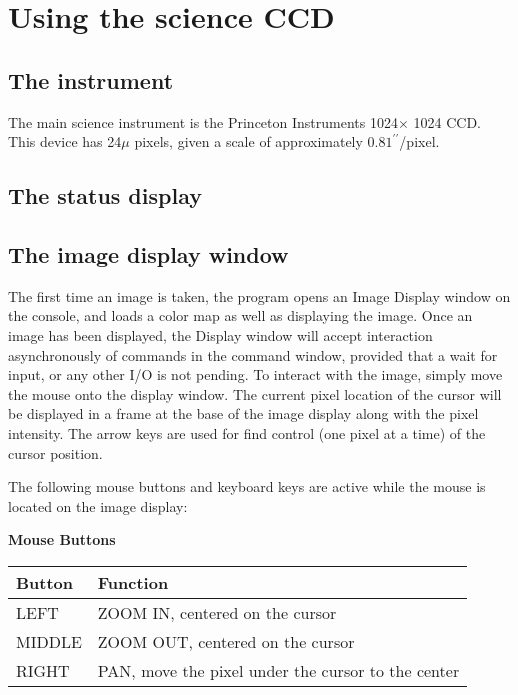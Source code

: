 \documentclass[10pt]{report}
\renewcommand{\[}{\begin{eqnarray}}
\renewcommand{\]}{\end{eqnarray}}
\begin{document}
\chapter{Using the science CCD}

\section{The instrument}

The main science instrument is the Princeton Instruments 1024$\times$ 1024
CCD. This device has 24$\mu$ pixels, given a scale of approximately
$0.81 ^{\prime\prime}$/pixel.

\section{The status display}

\section{The image display window}
The first time an image is taken, the program opens an Image Display
window on the console, and loads a color map as well as displaying the
image.  Once an image has been displayed, the Display window will accept
interaction asynchronously of commands in the command window,
provided that a wait for input, or any other I/O is not pending.  To
interact with the image, simply move the mouse onto the display window.
The current pixel location of the cursor will be displayed in a frame at
the base of the image display along with the pixel intensity.  The arrow
keys are used for find control (one pixel at a time) of the cursor
position.

The following mouse buttons and keyboard keys are active while the mouse
is located on the image display:

\begin{center}
{\bf Mouse Buttons}\\
\begin{tabular}{ll}
\hline
Button & Function\\
\hline
LEFT  &ZOOM IN, centered on the cursor\\
MIDDLE&ZOOM OUT, centered on the cursor\\
RIGHT &PAN, move the pixel under the cursor to the center\\
\hline
\end{tabular}
\end{center}
\end{document}
